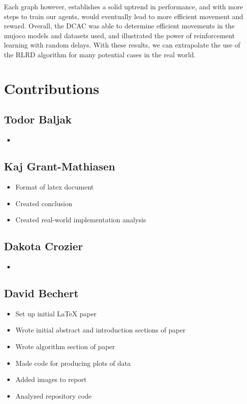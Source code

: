 \documentclass{article} %
\begin{document}
Each graph however, establishes a solid uptrend in performance, and with more steps to train our agents, would eventually lead to more efficient movement and reward. Overall, the DCAC was able to determine efficient movements in the mujoco models and datasets used, and illustrated the power of reinforcement learning with random delays. With these results, we can extrapolate the use of the RLRD algorithm for many potential cases in the real world.
\\

\section{Contributions}

\begin{multicols}{2}

\subsection{Todor Baljak}
\begin{itemize}[itemsep=-2pt,topsep=-5pt, leftmargin=10pt]
\item 
\end{itemize}

\subsection{Kaj Grant-Mathiasen}
\begin{itemize}[itemsep=-2pt,topsep=-5pt, leftmargin=10pt]
\item Format of latex document
\item Created conclusion
\item Created real-world implementation analysis
\end{itemize}

\subsection{Dakota Crozier}
\begin{itemize}[itemsep=-2pt,topsep=-5pt, leftmargin=10pt]
\item 
\end{itemize}

\columnbreak

\subsection{David Bechert}
\begin{itemize}[itemsep=-2pt,topsep=-5pt, leftmargin=10pt]
\item Set up initial LaTeX paper
\item Wrote initial abstract and introduction sections of paper
\item Wrote algorithm section of paper
\item Made code for producing plots of data
\item Added images to report
\item Analyzed repository code
\end{itemize}


\end{multicols}
\end{document}
